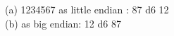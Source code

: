 \documentclass{article}
\begin{document}
\noindent(a) 1234567 as little endian : 87 d6 12\\
(b) as big endian: 12 d6 87
\end{document}
